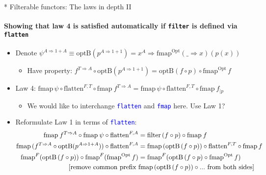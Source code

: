 \documentclass[english]{beamer}
\begin{document}
\begin{frame}{{*} Filterable functors: The laws in depth II}


\framesubtitle{Showing that law 4 is satisfied automatically if \texttt{\footnotesize{}filter}
is defined via \texttt{\footnotesize{}flatten}}
\begin{itemize}
\item Denote {\footnotesize{}$\psi^{A\Rightarrow1+A}\equiv\text{optB}\left(p^{A\Rightarrow1+1}\right)=x^{A}\Rightarrow\text{fmap}^{\text{Opt}}\left(\_\Rightarrow x\right)(p(x))$}{\footnotesize \par}
\begin{itemize}
\item Have property: {\footnotesize{}$f^{T\Rightarrow A}\circ\text{optB}\left(p^{A\Rightarrow1+1}\right)=\text{optB}\left(f\circ p\right)\circ\text{fmap}^{\text{Opt}}\,f$}{\footnotesize \par}
\end{itemize}
\item Law 4: {\footnotesize{}$\text{fmap}\,\psi\circ\text{flatten}^{F,T}\circ\text{fmap}\:f^{T\Rightarrow A}=\text{fmap}\,\psi\circ\text{flatten}^{F,T}\circ\text{fmap}\:f_{|p}$}{\footnotesize \par}
\begin{itemize}
\item We would like to interchange \texttt{\textcolor{blue}{\footnotesize{}flatten}}
and \texttt{\textcolor{blue}{\footnotesize{}fmap}} here. Use Law 1?
\end{itemize}
\item Reformulate Law 1 in terms of \texttt{\textcolor{blue}{\footnotesize{}flatten}}:
{\footnotesize{}
\begin{align*}
\text{fmap}\:f^{T\Rightarrow A}\circ\text{fmap}\:\psi\circ\text{flatten}^{F,A} & =\text{filter}\left(f\circ p\right)\circ\text{fmap}\:f\\
\text{fmap}\,(f^{T\Rightarrow A}\circ\text{optB}(p^{A\Rightarrow1+A}))\circ\text{flatten}^{F,A} & =\text{fmap}\left(\text{optB}\left(f\circ p\right)\right)\circ\text{flatten}^{F,T}\circ\text{fmap}\,f\\
\text{fmap}^{F}(\text{optB}\left(f\circ p\right))\circ\text{fmap}^{F}(\text{fmap}^{\text{Opt}}\,f) & =\text{fmap}^{F}(\text{optB}\left(f\circ p\right)\circ\text{fmap}^{\text{Opt}}\,f)\\
{\normalcolor \text{[remove common prefix }} & \text{fmap}\left(\text{optB}\left(f\circ p\right)\right)\circ...\text{ from both sides]}\\

\end{align*}}
\end{itemize}
\end{frame}
\end{document}
